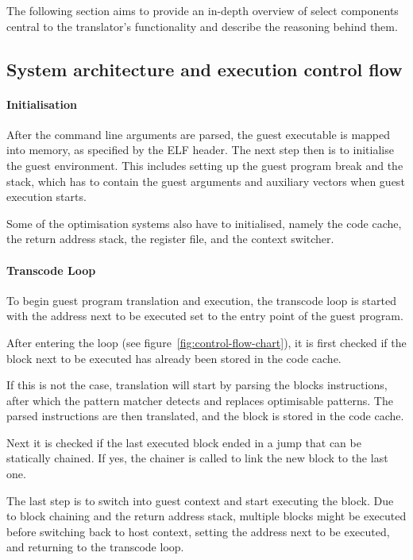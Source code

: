 The following section aims to provide an in-depth overview of select components central to the translator's functionality and describe the reasoning behind them. %

\subsection{System architecture and execution control flow}
\paragraph{Initialisation}\mbox{}

After the command line arguments are parsed, the guest executable is mapped into memory, as specified by the ELF header. 
The next step then is to initialise the guest environment.
This includes setting up the guest program break and the stack, which has to contain the guest arguments and auxiliary vectors when guest execution starts.

Some of the optimisation systems also have to initialised, namely the code cache, the return address stack, the register file, and the context switcher.

\paragraph{Transcode Loop}\mbox{}

To begin guest program translation and execution, the transcode loop is started with the address next to be executed set to the entry point of the guest program.

After entering the loop (see figure~\ref{fig:control-flow-chart}), it is first checked if the block next to be executed has already been stored in the code cache.

If this is not the case, translation will start by parsing the blocks instructions, after which the pattern matcher detects and replaces optimisable patterns.
The parsed instructions are then translated, and the block is stored in the code cache.

Next it is checked if the last executed block ended in a jump that can be statically chained.
If yes, the chainer is called to link the new block to the last one.

The last step is to switch into guest context and start executing the block.
Due to block chaining and the return address stack, multiple blocks might be executed before switching back to host context, setting the address next to be executed, and returning to the transcode loop.

